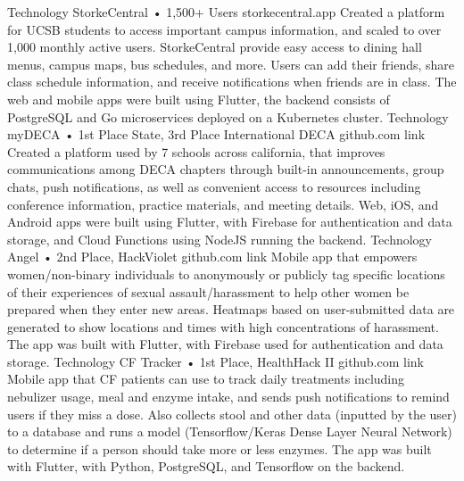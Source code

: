 \documentclass[9pt]{developercv} %
\begin{document}
\vspace{-14 pt}
\begin{entrylist}
    \entry
		{Technology}
		{StorkeCentral • 1,500+ Users}
		{storkecentral.app}
		{
            Created a platform for UCSB students to access important campus information, and scaled to over 1,000 monthly active users.
            StorkeCentral provide easy access to dining hall menus, campus maps, bus schedules, and more.
            Users can add their friends, share class schedule information, and receive notifications when friends are in class.
            The web and mobile apps were built using Flutter, the backend consists of PostgreSQL and Go microservices deployed on a Kubernetes cluster.
        }
    \entry
		{Technology}
		{myDECA • 1st Place State, 3rd Place International DECA}
		{github.com link}
		{
            Created a platform used by 7 schools across california, that improves communications among DECA chapters through built-in announcements, group chats, push notifications, as well as convenient access to resources including conference information, practice materials, and meeting details.
            Web, iOS, and Android apps were built using Flutter, with Firebase for authentication and data storage, and Cloud Functions using NodeJS running the backend.
        }
	\entry
		{Technology}
		{Angel • 2nd Place, HackViolet}
		{github.com link}
		{
            Mobile app that empowers women/non-binary individuals to anonymously or publicly tag specific locations of their experiences of sexual assault/harassment to help other women be prepared when they enter new areas.
            Heatmaps based on user-submitted data are generated to show locations and times with high concentrations of harassment.
            The app was built with Flutter, with Firebase used for authentication and data storage.
        }
    \entry
		{Technology}
		{CF Tracker • 1st Place, HealthHack II}
		{github.com link}
		{
            Mobile app that CF patients can use to track daily treatments including nebulizer usage, meal and enzyme intake, and sends push notifications to remind users if they miss a dose.
            Also collects stool and other data (inputted by the user) to a database and runs a model (Tensorflow/Keras Dense Layer Neural Network) to determine if a person should take more or less enzymes.
            The app was built with Flutter, with Python, PostgreSQL, and Tensorflow on the backend.
        }
\end{entrylist}
\end{document}
